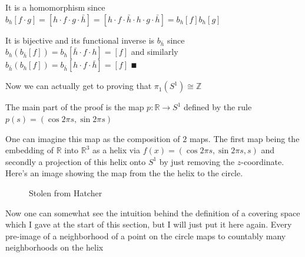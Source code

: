 \documentclass[paper=a4,fontsize=paper,12.5pt]{book}
\newcommand{\3}{\vspace*{3mm}}
\newcommand{\fund}[1]{{\pi}_{1}(#1)}
\newcommand{\Z}{\mathbb{Z}}
\newcommand{\R}{\mathbb{R}}
\newcommand{\C}[1]{{S}^{#1}}
\begin{document}
\3

It is a homomorphism since ${b}_{h}[f \cdot g] = [h \cdot f \cdot g \cdot \bar{h}] = [ h \cdot f \cdot \bar{h} \cdot h \cdot g \cdot \bar{h}] = {b}_{h}[f]{b}_{h}[g]$

\3

It is bijective and its functional inverse is ${b}_{\bar{h}}$ since ${b}_{h}({b}_{\bar{h}}[f]) = {b}_{h}[\bar{h} \cdot f \cdot h] = [f]$ and similarly ${b}_{\bar{h}}({b}_{h}[f]) = {b}_{\bar{h}}[h \cdot f \cdot \bar{h}] = [f]$ $\QED$


\newpage


Now we can actually get to proving that $\fund{\C{1}} \cong \Z$

\3

The main part of the proof is the map $p: \R \to \C{1}$ defined by the rule $p(s) = (\cos 2\pi s, \sin 2\pi s)$

\3

One can imagine this map as the composition of $2$ maps. The first map being the embedding of $\R$ into ${\mathbb{R}}^{3}$ as a helix via $f(x) = (\cos 2\pi s, \sin 2\pi s,s)$ and secondly a projection of this helix onto $\C{1}$ by just removing the $z$-coordinate. Here's an image showing the map from the the helix to the circle. 

\3

{
 \begin{figure}[!hbt]
 \begin{center}
 \begin{minipage}{0.85\textwidth}
 \caption{\label{helix}\small{Stolen from Hatcher}}
 \end{minipage}
 \end{center}
 \end{figure}
 }

\3

Now one can somewhat see the intuition behind the definition of a covering space which I gave at the start of this section, but I will just put it here again. Every pre-image of a neighborhood of a point on the circle maps to countably many neighborhoods on the helix
\end{document}
